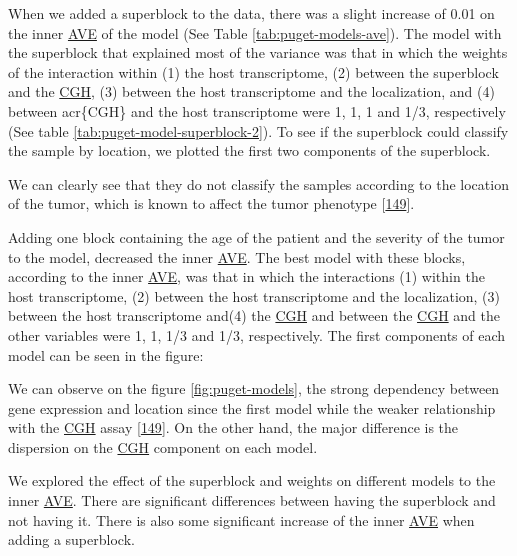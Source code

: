 \documentclass[
  12pt,
  a4paper,
  twoside,
  openright]{book}
\begin{document}
When we added a superblock to the data, there was a slight increase of 0.01 on the inner \protect\hyperlink{acronyms_AVE}{AVE} of the model (See Table \ref{tab:puget-models-ave}).
The model with the superblock that explained most of the variance was that in which the weights of the interaction within (1) the host transcriptome, (2) between the superblock and the \protect\hyperlink{acronyms_CGH}{CGH}, (3) between the host transcriptome and the localization, and (4) between acr\{CGH\} and the host transcriptome were 1, 1, 1 and 1/3, respectively (See table \ref{tab:puget-model-superblock-2}).
To see if the superblock could classify the sample by location, we plotted the first two components of the superblock.

We can clearly see that they do not classify the samples according to the location of the tumor, which is known to affect the tumor phenotype {[}\protect\hyperlink{ref-puget2012}{149}{]}.

Adding one block containing the age of the patient and the severity of the tumor to the model, decreased the inner \protect\hyperlink{acronyms_AVE}{AVE}.
The best model with these blocks, according to the inner \protect\hyperlink{acronyms_AVE}{AVE}, was that in which the interactions (1) within the host transcriptome, (2) between the host transcriptome and the localization, (3) between the host transcriptome and(4) the \protect\hyperlink{acronyms_CGH}{CGH} and between the \protect\hyperlink{acronyms_CGH}{CGH} and the other variables were 1, 1, 1/3 and 1/3, respectively.
The first components of each model can be seen in the figure:

We can observe on the figure \ref{fig:puget-models}, the strong dependency between gene expression and location since the first model while the weaker relationship with the \protect\hyperlink{acronyms_CGH}{CGH} assay {[}\protect\hyperlink{ref-puget2012}{149}{]}.
On the other hand, the major difference is the dispersion on the \protect\hyperlink{acronyms_CGH}{CGH} component on each model.

We explored the effect of the superblock and weights on different models to the inner \protect\hyperlink{acronyms_AVE}{AVE}.
There are significant differences between having the superblock and not having it.
There is also some significant increase of the inner \protect\hyperlink{acronyms_AVE}{AVE} when adding a superblock.
\end{document}
